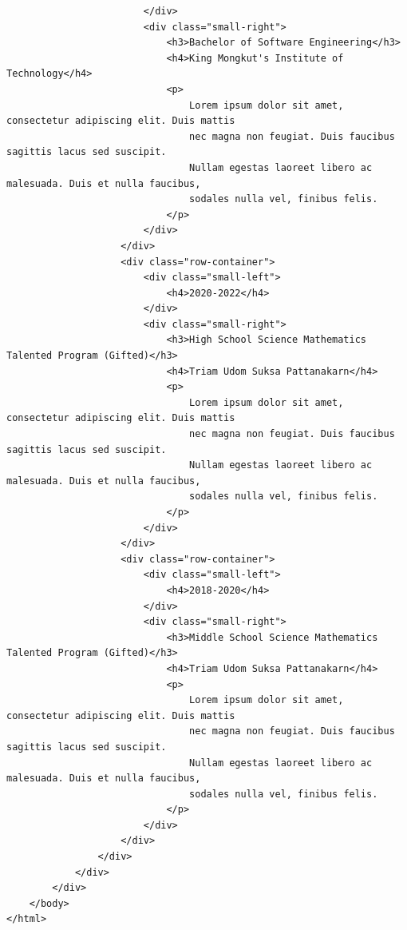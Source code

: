 \documentclass[12pt]{report} %
\begin{document}
\begin{verbatim}
                        </div>
                        <div class="small-right">
                            <h3>Bachelor of Software Engineering</h3>
                            <h4>King Mongkut's Institute of Technology</h4>
                            <p>
                                Lorem ipsum dolor sit amet, consectetur adipiscing elit. Duis mattis 
                                nec magna non feugiat. Duis faucibus sagittis lacus sed suscipit. 
                                Nullam egestas laoreet libero ac malesuada. Duis et nulla faucibus, 
                                sodales nulla vel, finibus felis.
                            </p>
                        </div>
                    </div>
                    <div class="row-container">
                        <div class="small-left">
                            <h4>2020-2022</h4>
                        </div>
                        <div class="small-right">
                            <h3>High School Science Mathematics Talented Program (Gifted)</h3>
                            <h4>Triam Udom Suksa Pattanakarn</h4>
                            <p>
                                Lorem ipsum dolor sit amet, consectetur adipiscing elit. Duis mattis 
                                nec magna non feugiat. Duis faucibus sagittis lacus sed suscipit. 
                                Nullam egestas laoreet libero ac malesuada. Duis et nulla faucibus, 
                                sodales nulla vel, finibus felis.
                            </p>
                        </div>
                    </div>
                    <div class="row-container">
                        <div class="small-left">
                            <h4>2018-2020</h4>
                        </div>
                        <div class="small-right">
                            <h3>Middle School Science Mathematics Talented Program (Gifted)</h3>
                            <h4>Triam Udom Suksa Pattanakarn</h4>
                            <p>
                                Lorem ipsum dolor sit amet, consectetur adipiscing elit. Duis mattis 
                                nec magna non feugiat. Duis faucibus sagittis lacus sed suscipit. 
                                Nullam egestas laoreet libero ac malesuada. Duis et nulla faucibus, 
                                sodales nulla vel, finibus felis.
                            </p>
                        </div>
                    </div>
                </div>
            </div>
        </div>
    </body>
</html>
\end{verbatim}
\end{document}
